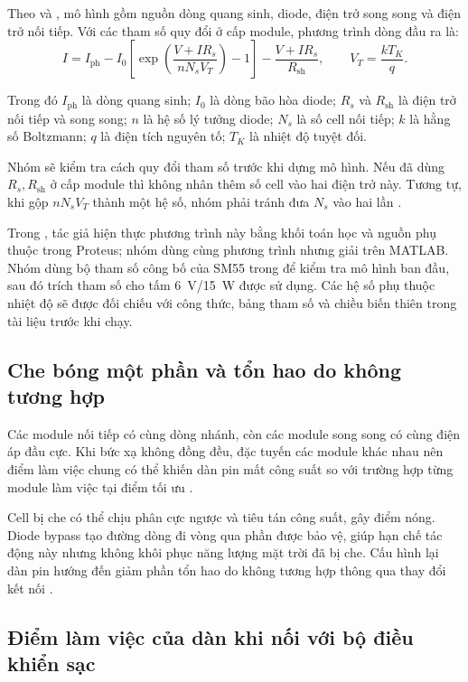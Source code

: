 Theo \cite{yaqoob} và \cite{pvpmc}, mô hình gồm nguồn dòng quang sinh, diode, điện trở song song và điện trở nối tiếp. Với các tham số quy đổi ở cấp module, phương trình dòng đầu ra là:
\[
I=I_{\mathrm{ph}}
-I_0\left[\exp\!\left(\frac{V+IR_s}{nN_sV_T}\right)-1\right]
-\frac{V+IR_s}{R_{\mathrm{sh}}},
\qquad
V_T=\frac{kT_K}{q}.
\]

Trong đó \(I_{\mathrm{ph}}\) là dòng quang sinh; \(I_0\) là dòng bão hòa diode; \(R_s\) và \(R_{\mathrm{sh}}\) là điện trở nối tiếp và song song; \(n\) là hệ số lý tưởng diode; \(N_s\) là số cell nối tiếp; \(k\) là hằng số Boltzmann; \(q\) là điện tích nguyên tố; \(T_K\) là nhiệt độ tuyệt đối.

Nhóm sẽ kiểm tra cách quy đổi tham số trước khi dựng mô hình. Nếu đã dùng \(R_s,R_{\mathrm{sh}}\) ở cấp module thì không nhân thêm số cell vào hai điện trở này. Tương tự, khi gộp \(nN_sV_T\) thành một hệ số, nhóm phải tránh đưa \(N_s\) vào hai lần \cite{pvpmc}.

Trong \cite{yaqoob}, tác giả hiện thực phương trình này bằng khối toán học và nguồn phụ thuộc trong Proteus; nhóm dùng cùng phương trình nhưng giải trên MATLAB. Nhóm dùng bộ tham số công bố của SM55 trong \cite{yaqoob} để kiểm tra mô hình ban đầu, sau đó trích tham số cho tấm 6~V/15~W được sử dụng. Các hệ số phụ thuộc nhiệt độ sẽ được đối chiếu với công thức, bảng tham số và chiều biến thiên trong tài liệu trước khi chạy.

\subsection{Che bóng một phần và tổn hao do không tương hợp}

Các module nối tiếp có cùng dòng nhánh, còn các module song song có cùng điện áp đầu cực. Khi bức xạ không đồng đều, đặc tuyến các module khác nhau nên điểm làm việc chung có thể khiến dàn pin mất công suất so với trường hợp từng module làm việc tại điểm tối ưu \cite{thanh}.

Cell bị che có thể chịu phân cực ngược và tiêu tán công suất, gây điểm nóng. Diode bypass tạo đường dòng đi vòng qua phần được bảo vệ, giúp hạn chế tác động này nhưng không khôi phục năng lượng mặt trời đã bị che. Cấu hình lại dàn pin hướng đến giảm phần tổn hao do không tương hợp thông qua thay đổi kết nối \cite{thanh}.

\subsection{Điểm làm việc của dàn khi nối với bộ điều khiển sạc}
\label{sec:charger-operating-point}

